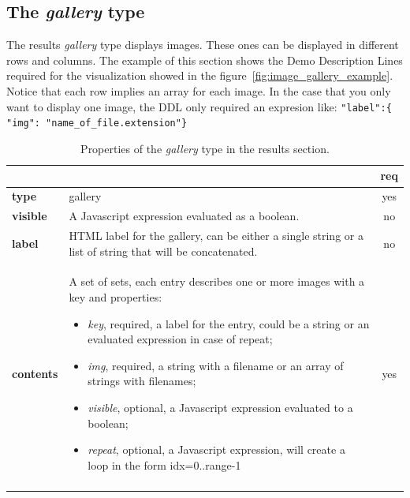 \subsection{The \emph{gallery} type}

The results \emph{gallery} type displays images. These ones can be displayed in different rows and columns. The example of this section shows the Demo Description Lines required for the visualization showed in the figure~\ref{fig:image_gallery_example}. Notice that each row implies an array for each image. In the case that you only want to display one image, the DDL only required an expresion like:  \texttt{"label":\{ "img": "name\_of\_file.extension"\}}

\begin{longtable}{|>{\bf}L{\linewidth}|L{\linewidth}|c|}
\hline
      &  & {\bf req} 
\tabularnewline \hline \hline
 type       & gallery  & yes \\ \hline
 visible    & A Javascript expression evaluated as a boolean. & no \\ \hline
 label      & HTML label for the gallery, can be either a single string or 
             a list of string that will be concatenated. & no \\ \hline
 contents   & A set of sets, each entry describes one or more images with a key and properties:
\vspace{-1em}
\begin{itemize}
    \setlength\itemsep{-0.5em}
    \item \textit{key}, required, a label for the entry, could be a string or an evaluated expression in case of repeat;
    \item \textit{img}, required, a string with a filename or an array of strings with filenames;
    \item \textit{visible}, optional, a Javascript expression evaluated to a boolean;
    \item \textit{repeat}, optional, a Javascript expression, will create a loop in the form idx=0..range-1
\end{itemize} 
\vspace{-1em} & yes \\ \hline
\caption{Properties of the \emph{gallery} type in the results section.}
\end{longtable}

